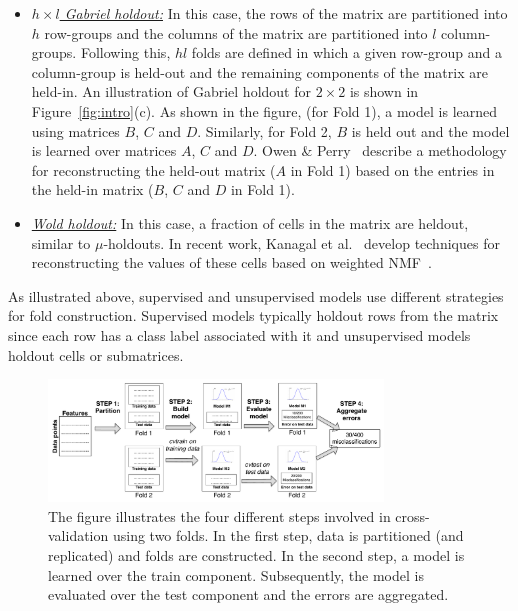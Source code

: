 \documentclass{vldb}
\newcommand{\eat}[1]{} %
\begin{document}
\begin{itemize}
\item \underline{\em $h\times l$ Gabriel holdout:} In this case, the rows of the matrix
are partitioned into $h$ row-groups and the columns of the matrix are
partitioned into $l$ column-groups. Following this, $hl$ folds are defined in
which a given row-group and a column-group is held-out and the remaining
components of the matrix are held-in. An illustration of Gabriel holdout for
$2\times 2$ is shown in Figure~\ref{fig:intro}(c). As shown in the figure, (for
Fold 1), a model is learned using matrices $B$, $C$ and $D$. Similarly, for Fold
2, $B$ is held out and the model is learned over matrices $A$, $C$ and $D$.
Owen \&
Perry~\cite{PerryO09} describe a methodology for reconstructing the held-out
matrix ($A$ in Fold 1) based on the entries in the held-in matrix ($B$, $C$ and
$D$ in Fold 1).
\item \underline{\em Wold holdout:} In this case, a fraction of cells in the matrix are
heldout, similar to $\mu$-holdouts. In recent work, Kanagal et
al.~\cite{nips2010} develop techniques for reconstructing the values of these
cells based on weighted NMF~\cite{DBLP:conf/icml/SrebroJ03}.
\end{itemize}

As illustrated above, supervised and unsupervised models use different
strategies for fold construction. Supervised models typically
holdout rows from the matrix since each row has a class label associated with
it and unsupervised models holdout cells or submatrices. 
\eat{In
the next section, we provide a unified abstraction for the various
cross-validation methodologies discussed here.}

\begin{figure}
\centering
\includegraphics[width=3.5in]{illustration}
\caption{The figure illustrates the four different steps involved in cross-validation
using two folds. In the first step, data is partitioned (and replicated) and
folds are constructed. In the second step, a model is learned over the train
component. Subsequently, the model is evaluated over the test component and the
errors are aggregated.}
\label{fig:illustration}
\end{figure}
\end{document}
